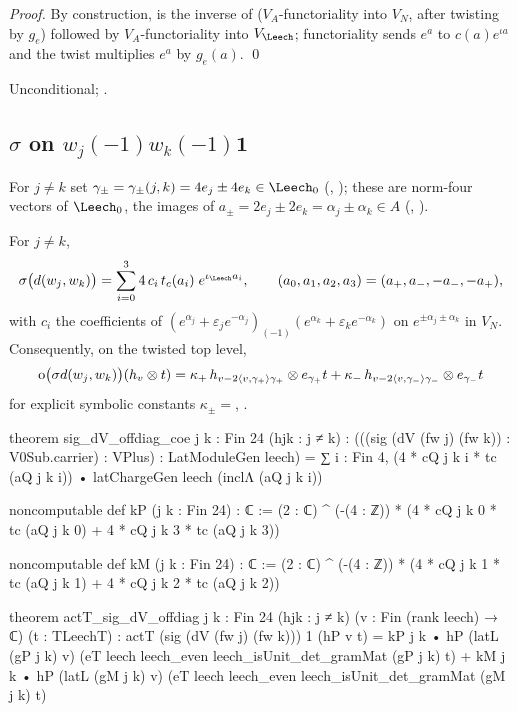 \noindent\emph{Proof.} By construction,  is the inverse of ($V_A$-functoriality into $V_N$,
after twisting by $g_e$) followed by $V_A$-functoriality into $V_\Leech$; functoriality sends $e^a$ to
$c(a)e^{\iota a}$ and the twist multiplies $e^a$ by $g_e(a)$. \qed
\begin{status}Unconditional; .\end{status}

\subsection{\texorpdfstring{$\sigma$ on $w_j(-1)w_k(-1)\mathbf 1$}{sigma on wj(-1)wk(-1)mathbf 1}}
For $j\ne k$ set $\gamma_\pm=\gamma_\pm(j,k)=4e_j\pm4e_k\in\Leech_0$ (, ); these are
norm-four vectors of $\Leech_0$, the images of $a_\pm=2e_j\pm2e_k=\alpha_j\pm\alpha_k\in A$
(, ).
\begin{proposition}\label{ch13:prop:sig-offdiag}
For $j\ne k$,
\begin{equation*}
  \sigma\bigl(d(w_j,w_k)\bigr)=\sum_{i=0}^{3}4\,c_i\,t_c(a_i)\;e^{\iota_\Leech a_i},\qquad
  (a_0,a_1,a_2,a_3)=(a_+,a_-,-a_-,-a_+),
\end{equation*}
with $c_i$ the coefficients of
$(e^{\alpha_j}+\varepsilon_je^{-\alpha_j})_{(-1)}(e^{\alpha_k}+\varepsilon_ke^{-\alpha_k})$ on $e^{\pm\alpha_j\pm\alpha_k}$ in $V_N$.
Consequently, on the twisted top level,
\begin{equation*}
  \operatorname{o}\bigl(\sigma d(w_j,w_k)\bigr)(h_v\otimes t)=\kappa_+\,h_{v-2\langle v,\gamma_+\rangle\gamma_+}\otimes e_{\gamma_+}t
  +\kappa_-\,h_{v-2\langle v,\gamma_-\rangle\gamma_-}\otimes e_{\gamma_-}t
\end{equation*}
for explicit symbolic constants $\kappa_\pm=$, .
\end{proposition}
\begin{leancode}
theorem sig_dV_offdiag_coe {j k : Fin 24} (hjk : j ≠ k) :
    (((sig (dV (fw j) (fw k)) : V0Sub.carrier) : VPlus) : LatModuleGen leech)
      = ∑ i : Fin 4, (4 * cQ j k i * tc (aQ j k i)) • latChargeGen leech (inclΛ (aQ j k i))

noncomputable def kP (j k : Fin 24) : ℂ :=
  (2 : ℂ) ^ (-(4 : ℤ)) * (4 * cQ j k 0 * tc (aQ j k 0) + 4 * cQ j k 3 * tc (aQ j k 3))

noncomputable def kM (j k : Fin 24) : ℂ :=
  (2 : ℂ) ^ (-(4 : ℤ)) * (4 * cQ j k 1 * tc (aQ j k 1) + 4 * cQ j k 2 * tc (aQ j k 2))

theorem actT_sig_dV_offdiag {j k : Fin 24} (hjk : j ≠ k) (v : Fin (rank leech) → ℂ) (t : TLeechT) :
    actT (sig (dV (fw j) (fw k))) 1 (hP v t)
      = kP j k • hP (latL (gP j k) v) (eT leech leech_even leech_isUnit_det_gramMat (gP j k) t)
        + kM j k • hP (latL (gM j k) v) (eT leech leech_even leech_isUnit_det_gramMat (gM j k) t)
\end{leancode}
